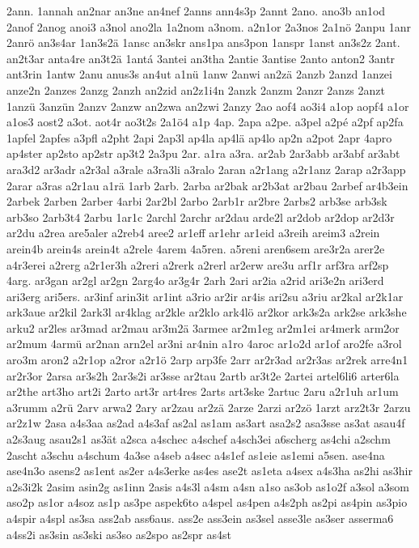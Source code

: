 {2ann.
1annah
an2nar
an3ne
an4nef
2anns
ann4s3p
2annt
2ano.
ano3b
an1od
2anof
2anog
anoi3
a3nol
ano2la
1a2nom
a3nom.
a2n1or
2a3nos
2a1nö
2anpu
1anr
2anrö
an3s4ar
1an3s2ä
1ansc
an3skr
ans1pa
ans3pon
1anspr
1anst
an3s2z
2ant.
an2t3ar
anta4re
an3t2ä
1antá
3antei
an3tha
2antie
3antise
2anto
anton2
3antr
ant3rin
1antw
2anu
anus3s
an4ut
a1nü
1anw
2anwi
an2zä
2anzb
2anzd
1anzei
anze2n
2anzes
2anzg
2anzh
an2zid
an2z1i4n
2anzk
2anzm
2anzr
2anzs
2anzt
1anzü
3anzün
2anzv
2anzw
an2zwa
an2zwi
2anzy
2ao
aof4
ao3i4
a1op
aopf4
a1or
a1os3
aost2
a3ot.
aot4r
ao3t2s
2a1ö4
a1p
4ap.
2apa
a2pe.
a3pel
a2pé
a2pf
ap2fa
1apfel
2apfes
a3pfl
a2pht
2api
2ap3l
ap4la
ap4lä
ap4lo
ap2n
a2pot
2apr
4apro
ap4ster
ap2sto
ap2str
ap3t2
2a3pu
2ar.
a1ra
a3ra.
ar2ab
2ar3abb
ar3abf
ar3abt
ara3d2
ar3adr
a2r3al
a3rale
a3ra3li
a3ralo
2aran
a2r1ang
a2r1anz
2arap
a2r3app
2arar
a3ras
a2r1au
a1rä
1arb
2arb.
2arba
ar2bak
ar2b3at
ar2bau
2arbef
ar4b3ein
2arbek
2arben
2arber
4arbi
2ar2bl
2arbo
2arb1r
ar2bre
2arbs2
arb3se
arb3sk
arb3so
2arb3t4
2arbu
1ar1c
2archl
2archr
ar2dau
arde2l
ar2dob
ar2dop
ar2d3r
ar2du
a2rea
are5aler
a2reb4
aree2
ar1eff
ar1ehr
ar1eid
a3reih
areim3
a2rein
arein4b
arein4s
arein4t
a2rele
4arem
4a5ren.
a5reni
aren6sem
are3r2a
arer2e
a4r3erei
a2rerg
a2r1er3h
a2reri
a2rerk
a2rerl
ar2erw
are3u
arf1r
arf3ra
arf2sp
4arg.
ar3gan
ar2gl
ar2gn
2arg4o
ar3g4r
2arh
2ari
ar2ia
a2rid
ari3e2n
ari3erd
ari3erg
ari5ers.
ar3inf
arin3it
ar1int
a3rio
ar2ir
ar4is
ari2su
a3riu
ar2kal
ar2k1ar
ark3aue
ar2kil
2ark3l
ar4klag
ar2kle
ar2klo
ark4lö
ar2kor
ark3s2a
ark2se
ark3she
arku2
ar2les
ar3mad
ar2mau
ar3m2ä
3armee
ar2m1eg
ar2m1ei
ar4merk
arm2or
ar2mum
4armü
ar2nan
arn2el
ar3ni
ar4nin
a1ro
4aroc
ar1o2d
ar1of
aro2fe
a3rol
aro3m
aron2
a2r1op
a2ror
a2r1ö
2arp
arp3fe
2arr
ar2r3ad
ar2r3as
ar2rek
arre4n1
ar2r3or
2arsa
ar3s2h
2ar3s2i
ar3sse
ar2tau
2artb
ar3t2e
2artei
artel6li6
arter6la
ar2the
art3ho
art2i
2arto
art3r
art4res
2arts
art3ske
2artuc
2aru
a2r1uh
ar1um
a3rumm
a2rü
2arv
arwa2
2ary
ar2zau
ar2zä
2arze
2arzi
ar2zö
1arzt
arz2t3r
2arzu
ar2z1w
2asa
a4s3aa
as2ad
a4s3af
as2al
as1am
as3art
asa2s2
asa3sse
as3at
asau4f
a2s3aug
asau2s1
as3ät
a2sca
a4schec
a4schef
a4sch3ei
a6scherg
as4chi
a2schm
2ascht
a3schu
a4schum
4a3se
a4seb
a4sec
a4s1ef
as1eie
as1emi
a5sen.
ase4na
ase4n3o
asens2
as1ent
as2er
a4s3erke
as4es
ase2t
as1eta
a4sex
a4s3ha
as2hi
as3hir
a2s3i2k
2asim
asin2g
as1inn
2asis
a4s3l
a4sm
a4sn
a1so
as3ob
as1o2f
a3sol
a3som
aso2p
as1or
a4soz
as1p
as3pe
aspek6to
a4spel
as4pen
a4s2ph
as2pi
as4pin
as3pio
a4spir
a4spl
as3sa
ass2ab
ass6aus.
ass2e
ass3ein
as3sel
asse3le
as3ser
asserma6
a4ss2i
as3sin
as3ski
as3so
as2spo
as2spr
as4st
}
